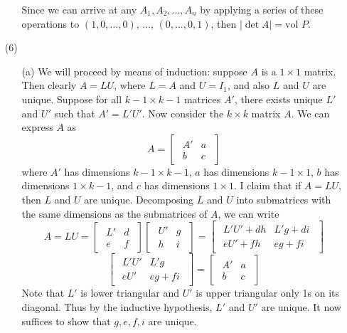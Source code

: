 \documentclass[12pt]{article}
\begin{document}
\begin{itemize}
\begin{itemize}
Since we can arrive at any $A_1, A_2, ..., A_n$ by applying a series of these operations to $(1, 0, ..., 0)$, ..., $(0, ..., 0, 1)$, then $|\det A| = \text{vol }P$.
\end{itemize}
\item[(6)]
\begin{itemize}
\item[(a)]
We will proceed by means of induction: suppose $A$ is a $1 \times 1$ matrix. Then clearly $A = LU$, where $L = A$ and $U = I_1$, and also $L$ and $U$ are unique. Suppose for all $k - 1 \times k - 1$ matrices $A'$, there exists unique $L'$ and $U'$ such that $A' = L'U'$. Now consider the $k \times k$ matrix $A$. We can express $A$ as
$$A = \begin{bmatrix}
\begin{array}{c|c}
A' & a \\
\hline
b & c
\end{array}
\end{bmatrix}$$
where $A'$ has dimensions $k - 1 \times k - 1$, $a$ has dimensions $k - 1 \times 1$, $b$ has dimensions $1 \times k - 1$, and $c$ has dimensions $1 \times 1$. I claim that if $A = LU$, then $L$ and $U$ are unique. Decomposing $L$ and $U$ into submatrices with the same dimensions as the submatrices of $A$, we can write
$$A = LU = \begin{bmatrix}
\begin{array}{c|c}
L' & d \\
\hline
e & f
\end{array}
\end{bmatrix}\begin{bmatrix}
\begin{array}{c|c}
U' & g \\ 
\hline
h & i
\end{array}
\end{bmatrix} = \begin{bmatrix}
\begin{array}{c|c}
L'U' + dh & L'g + di \\
\hline
eU' + fh & eg + fi
\end{array}
\end{bmatrix}$$
$$\begin{bmatrix}
\begin{array}{c|c}
L'U' & L'g \\
\hline
eU' & eg + fi
\end{array}
\end{bmatrix} = \begin{bmatrix}
\begin{array}{c|c}
A' & a \\
\hline
b & c
\end{array}
\end{bmatrix}$$
Note that $L'$ is lower triangular and $U'$ is upper triangular only 1s on its diagonal. Thus by the inductive hypothesis, $L'$ and $U'$ are unique. It now suffices to show that $g, e, f, i$ are unique.


\end{itemize}
\end{itemize}
\end{document}
